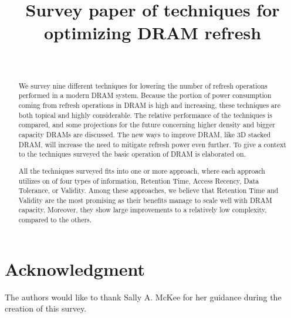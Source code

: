 \documentclass[journal, a4paper]{IEEEtran}
\begin{document}
\title{Survey paper of techniques for optimizing DRAM refresh}

\author{\\
}

\maketitle


\begin{abstract}
We survey nine different techniques for lowering the number of refresh operations performed in a modern DRAM system. Because the portion of power consumption coming from refresh operations in DRAM is high and increasing, these techniques are both topical and highly considerable. The relative performance of the techniques is compared, and some projections for the future concerning higher density and bigger capacity DRAMs are discussed. The new ways to improve DRAM, like 3D stacked DRAM, will increase the need to mitigate refresh power even further. To give a context to the techniques surveyed the basic operation of DRAM is elaborated on. 

All the techniques surveyed fits into one or more approach, where each approach utilizes on of four types of information, Retention Time, Access Recency, Data Tolerance, or Validity. Among these approaches, we believe that Retention Time and Validity are the most promising as their benefits manage to scale well with DRAM capacity. Moreover, they show large improvements to a relatively low complexity, compared to the others.
\end{abstract}







\section*{Acknowledgment}
The authors would like to thank Sally A. McKee for her guidance during the creation of this survey.



\IEEEtriggercmd{\newpage}




\end{document}
